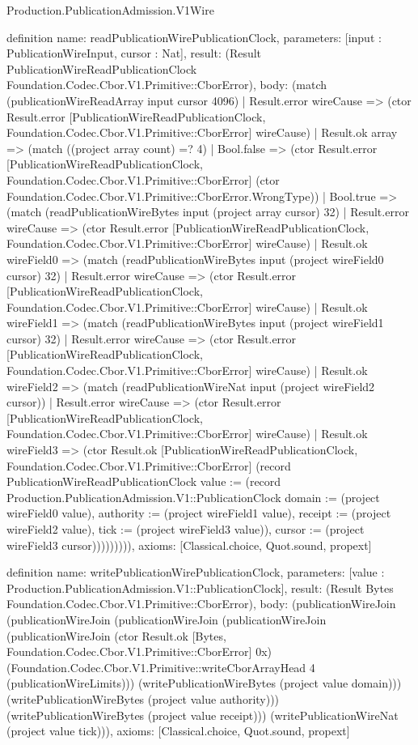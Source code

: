 \begin{lexlean}{Production.PublicationAdmission.V1Wire}
\begin{semanticmodule}
definition{
  name: readPublicationWirePublicationClock,
  parameters: [input : PublicationWireInput, cursor : Nat],
  result: (Result PublicationWireReadPublicationClock Foundation.Codec.Cbor.V1.Primitive::CborError),
  body: (match (publicationWireReadArray input cursor 4096)
    | Result.error wireCause => (ctor Result.error [PublicationWireReadPublicationClock, Foundation.Codec.Cbor.V1.Primitive::CborError] wireCause)
    | Result.ok array => (match ((project array count) =? 4)
      | Bool.false => (ctor Result.error [PublicationWireReadPublicationClock, Foundation.Codec.Cbor.V1.Primitive::CborError] (ctor Foundation.Codec.Cbor.V1.Primitive::CborError.WrongType))
      | Bool.true => (match (readPublicationWireBytes input (project array cursor) 32)
        | Result.error wireCause => (ctor Result.error [PublicationWireReadPublicationClock, Foundation.Codec.Cbor.V1.Primitive::CborError] wireCause)
        | Result.ok wireField0 => (match (readPublicationWireBytes input (project wireField0 cursor) 32)
          | Result.error wireCause => (ctor Result.error [PublicationWireReadPublicationClock, Foundation.Codec.Cbor.V1.Primitive::CborError] wireCause)
          | Result.ok wireField1 => (match (readPublicationWireBytes input (project wireField1 cursor) 32)
            | Result.error wireCause => (ctor Result.error [PublicationWireReadPublicationClock, Foundation.Codec.Cbor.V1.Primitive::CborError] wireCause)
            | Result.ok wireField2 => (match (readPublicationWireNat input (project wireField2 cursor))
              | Result.error wireCause => (ctor Result.error [PublicationWireReadPublicationClock, Foundation.Codec.Cbor.V1.Primitive::CborError] wireCause)
              | Result.ok wireField3 => (ctor Result.ok [PublicationWireReadPublicationClock, Foundation.Codec.Cbor.V1.Primitive::CborError] (record PublicationWireReadPublicationClock {value := (record Production.PublicationAdmission.V1::PublicationClock {domain := (project wireField0 value), authority := (project wireField1 value), receipt := (project wireField2 value), tick := (project wireField3 value)}), cursor := (project wireField3 cursor)})))))))),
  axioms: [Classical.choice, Quot.sound, propext]
}

definition{
  name: writePublicationWirePublicationClock,
  parameters: [value : Production.PublicationAdmission.V1::PublicationClock],
  result: (Result Bytes Foundation.Codec.Cbor.V1.Primitive::CborError),
  body: (publicationWireJoin (publicationWireJoin (publicationWireJoin (publicationWireJoin (publicationWireJoin (ctor Result.ok [Bytes, Foundation.Codec.Cbor.V1.Primitive::CborError] 0x) (Foundation.Codec.Cbor.V1.Primitive::writeCborArrayHead 4 (publicationWireLimits))) (writePublicationWireBytes (project value domain))) (writePublicationWireBytes (project value authority))) (writePublicationWireBytes (project value receipt))) (writePublicationWireNat (project value tick))),
  axioms: [Classical.choice, Quot.sound, propext]
}


\end{semanticmodule}
\end{lexlean}

